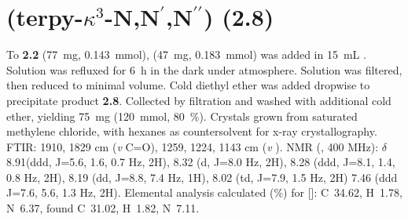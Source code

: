 \section{(terpy-$\kappa^3$-N,N$^\prime$,N$^{\prime \prime}$) (\textbf{2.8})}\label{sec.c8}
To \textbf{2.2} (77~mg,  0.143~mmol),  (47~mg,  0.183~mmol) was added in 15~mL . Solution was refluxed for 6~h in the dark under  atmosphere. Solution was filtered, then reduced to minimal volume. Cold diethyl ether was added dropwise to precipitate product \textbf{2.8}. Collected by filtration and washed with additional cold ether, yielding 75~mg (120~mmol, 80~\%).  Crystals grown from saturated methylene chloride, with hexanes as countersolvent for x-ray crystallography. FTIR: 1910, 1829 cm (\textit{v} C=O), 1259, 1224, 1143 cm (\textit{v} ).  NMR (, 400 MHz): $\delta$ 8.91(ddd, J=5.6, 1.6, 0.7 Hz, 2H), 8.32 (d, J=8.0 Hz, 2H), 8.28 (ddd, J=8.1, 1.4, 0.8 Hz, 2H), 8.19 (dd, J=8.8, 7.4 Hz, 1H), 8.02 (td, J=7.9, 1.5 Hz, 2H) 7.46 (ddd J=7.6, 5.6, 1.3 Hz, 2H).  Elemental analysis calculated (\%) for []: C~34.62, H~1.78, N~6.37, found C~31.02, H~1.82, N~7.11.


